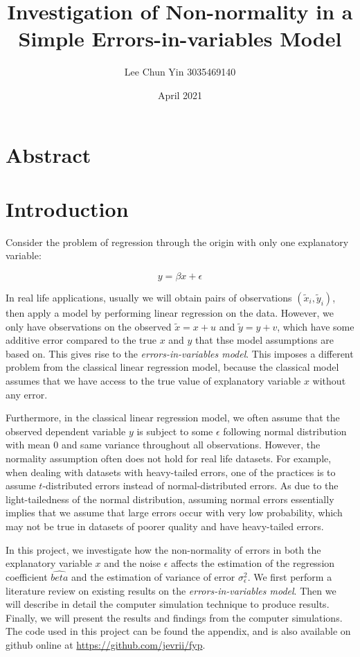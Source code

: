 \documentclass{article}
\title{Investigation of Non-normality in a Simple Errors-in-variables Model}
\author{Lee Chun Yin 3035469140}
\date{April 2021}
\begin{document}
\maketitle

\section{Abstract}

\section{Introduction}

Consider the problem of regression through the origin with only one explanatory variable:

$$
y = \beta x + \epsilon
$$

In real life applications, usually we will obtain pairs of observations $(\tilde{x}_i, \tilde{y}_i)$, then apply a model by performing linear regression on the data. However, we only have observations on the observed $\tilde{x} = x + u$ and $\tilde{y} = y + v$, which have some additive error compared to the true $x$ and $y$ that thse model assumptions are based on. This gives rise to the \textit{errors-in-variables model}. This imposes a different problem from the classical linear regression model, because the classical model assumes that we have access to the true value of explanatory variable $x$ without any error. 

Furthermore, in the classical linear regression model, we often assume that the observed dependent variable $y$ is subject to some $\epsilon$ following normal distribution with mean $0$ and same variance throughout all observations. However, the normality assumption often does not hold for real life datasets. For example, when dealing with datasets with heavy-tailed errors, one of the practices is to assume $t$-distributed errors instead of normal-distributed errors. As due to the light-tailedness of the normal distribution, assuming normal errors essentially implies that we assume that large errors occur with very low probability, which may not be true in datasets of poorer quality and have heavy-tailed errors.

In this project, we investigate how the non-normality of errors in both the explanatory variable $x$ and the noise $\epsilon$ affects the estimation of the regression coefficient $\hat{beta}$ and the estimation of variance of error $\sigma^2_\epsilon$. We first perform a literature review on existing results on the \textit{errors-in-variables model}. Then we will describe in detail the computer simulation technique to produce results. Finally, we will present the results and findings from
the computer simulations. The code used in this project can be found the appendix, and is also available on github online at \url{https://github.com/jevrii/fyp}.
\end{document}
